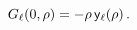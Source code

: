 $\mathop{G_{\ell}\/}\nolimits\!\left(0,\rho\right)=-\rho\mathop{\mathsf{y}_{%
\ell}\/}\nolimits\!\left(\rho\right).$